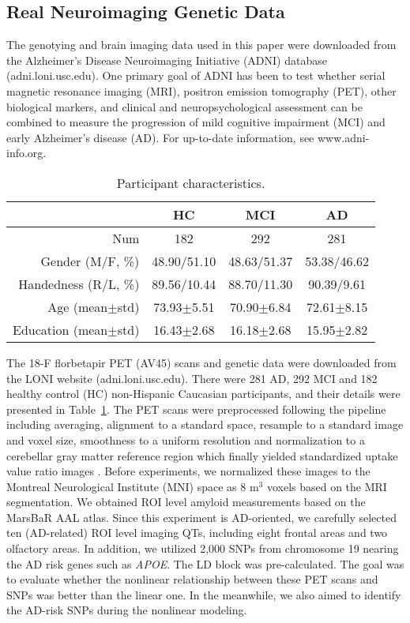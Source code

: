 \documentclass{llncs}
\begin{document}
\subsection{Real Neuroimaging Genetic Data}

The genotying and brain imaging data used in this paper were downloaded from the Alzheimer's Disease Neuroimaging Initiative (ADNI) database (adni.loni.usc.edu). One primary goal of ADNI has been to test whether serial magnetic resonance imaging (MRI), positron emission tomography (PET), other biological markers, and clinical and neuropsychological assessment can be combined to measure the progression of mild cognitive impairment (MCI) and early Alzheimer's disease (AD). For up-to-date information, see www.adni-info.org.

\begin{table}[htbp]  \scriptsize
  \centering
  \caption{Participant characteristics.}
    \begin{tabular}{rccc}
    \toprule
          & HC    & MCI   & AD \\
    \midrule
    Num   & 182   & 292   & 281 \\
    Gender (M/F, \%) & 48.90/51.10 & 48.63/51.37 & 53.38/46.62 \\
    Handedness (R/L, \%) & 89.56/10.44 & 88.70/11.30 & 90.39/9.61 \\
    Age (mean$\pm$std) & 73.93$\pm$5.51 & 70.90$\pm$6.84 & 72.61$\pm$8.15 \\
    Education (mean$\pm$std) & 16.43$\pm$2.68 & 16.18$\pm$2.68 & 15.95$\pm$2.82 \\
    \bottomrule
    \end{tabular}%
  \label{tab:demographics}%
\end{table}%

The 18-F florbetapir PET (AV45) scans and genetic data were downloaded from the LONI website (adni.loni.usc.edu). There were 281 AD, 292 MCI and 182 healthy control (HC) non-Hispanic Caucasian participants, and their details were presented in Table~\ref{tab:demographics}. The PET scans were preprocessed following the pipeline including averaging, alignment to a standard space, resample to a standard image and voxel size, smoothness to a uniform resolution and normalization to a cerebellar gray matter reference region which finally yielded standardized uptake value ratio images \cite{jagust2010}. Before experiments, we normalized these images to the Montreal Neurological Institute (MNI) space as 8 m$^3$ voxels based on the MRI segmentation. We obtained ROI level amyloid measurements based on the MarsBaR AAL atlas. Since this experiment is AD-oriented, we carefully selected ten (AD-related) ROI level imaging QTs, including eight frontal areas and two olfactory areas. In addition, we utilized 2,000 SNPs from chromosome 19 nearing the AD risk genes such as \emph{APOE}. The LD block was pre-calculated. The goal was to evaluate whether the nonlinear relationship between these PET scans and SNPs was better than the linear one. In the meanwhile, we also aimed to identify the AD-risk SNPs during the nonlinear modeling.
\end{document}
